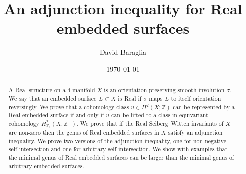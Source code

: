 \documentclass{amsart}
\theoremstyle{definition}
\theoremstyle{remark}
\numberwithin{equation}{section}
\begin{document}
\setlength\parskip{0.5em plus 0.1em minus 0.2em}

\title[An adjunction inequality for Real embedded surfaces]{An adjunction inequality for Real embedded surfaces}
\author{David Baraglia}


\address{School of Mathematical Sciences, The University of Adelaide, Adelaide SA 5005, Australia}





\date{\today}


\begin{abstract}
A Real structure on a $4$-manifold $X$ is an orientation preserving smooth involution $\sigma$. We say that an embedded surface $\Sigma \subset X$ is Real if $\sigma$ maps $\Sigma$ to itself orientation reversingly. We prove that a cohomology class $u \in H^2(X ; \mathbb{Z})$ can be represented by a Real embedded surface if and only if $u$ can be lifted to a class in equivariant cohomology $H^2_{\mathbb{Z}_2}(X ; \mathbb{Z}_-)$. We prove that if the Real Seiberg--Witten invariants of $X$ are non-zero then the genus of Real embedded surfaces in $X$ satisfy an adjunction inequality. We prove two versions of the adjunction inequality, one for non-negative self-intersection and one for arbitrary self-intersection. We show with examples that the minimal genus of Real embedded surfaces can be larger than the minimal genus of arbitrary embedded surfaces.
\end{abstract}



\maketitle

\end{document}

